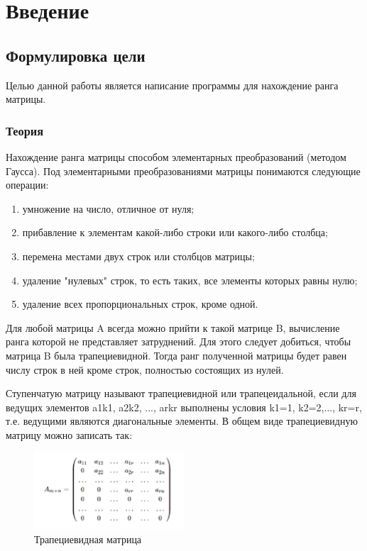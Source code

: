 \documentclass[12pt,a4paper]{scrartcl}
\begin{document}
\section{Введение}
\label{sec:intro}


\subsection{Формулировка цели}
Целью данной работы является написание программы для нахождение ранга матрицы.

\subsubsection{Теория}
Нахождение ранга матрицы способом элементарных преобразований
(методом Гаусса). Под элементарными преобразованиями матрицы понимаются
следующие операции:
    \begin{enumerate}
        \item умножение на число, отличное от нуля;
        \item прибавление к элементам какой-либо строки или какого-либо столбца;
        \item перемена местами двух строк или столбцов матрицы;
        \item удаление "нулевых" строк, то есть таких, все элементы которых равны нулю;
        \item удаление всех пропорциональных строк, кроме одной.
    \end{enumerate}
    \noindent 
Для любой матрицы A всегда можно прийти к такой матрице B,
вычисление ранга которой не представляет затруднений. Для этого следует
добиться, чтобы матрица B была трапециевидной. Тогда ранг полученной
матрицы будет равен числу строк в ней кроме строк, полностью состоящих из
нулей.

Ступенчатую матрицу называют трапециевидной или трапецеидальной,
если для ведущих элементов a1k1, a2k2, ..., arkr выполнены условия k1=1,
k2=2,..., kr=r, т.е. ведущими являются диагональные элементы. В общем виде
трапециевидную матрицу можно записать так:

\label{sec:picexample}
\begin{figure}[h]
 \centering
 \includegraphics[width=0.5\textwidth]{theory.jpg}
    \caption{Трапециевидная матрица}\label{fig:par}

\end{figure}
\vfill
\newpage
\end{document}
